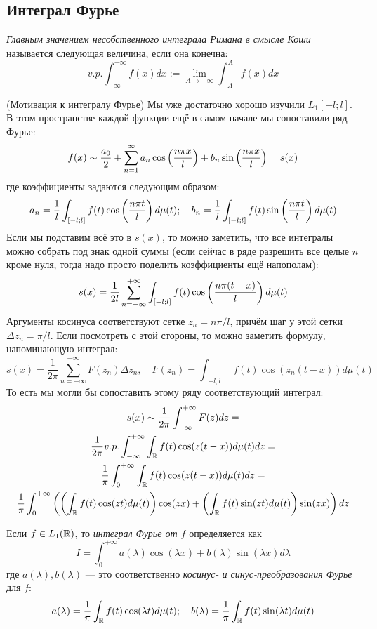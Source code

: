 \subsection{Интеграл Фурье}

\begin{reminder}
	\textit{Главным значением несобственного интеграла Римана в смысле Коши} называется следующая величина, если она конечна:
	\[
		v.p. \int_{-\infty}^{+\infty} f(x)dx := \lim_{A \to +\infty} \int_{-A}^A f(x)dx
	\]
\end{reminder}

\begin{note} (Мотивация к интегралу Фурье)
	Мы уже достаточно хорошо изучили $L_1[-l; l]$. В этом пространстве каждой функции ещё в самом начале мы сопоставили ряд Фурье:
	\[
		f(x) \sim \frac{a_0}{2} + \sum_{n = 1}^\infty a_n \cos\left(\frac{n\pi x}{l}\right) + b_n\sin\left(\frac{n\pi x}{l}\right) = s(x)
	\]
	где коэффициенты задаются следующим образом:
	\[
		a_n = \frac{1}{l}\int_{[-l; l]} f(t)\cos\left(\frac{n\pi t}{l}\right)d\mu(t); \quad b_n = \frac{1}{l}\int_{[-l; l]} f(t)\sin\left(\frac{n\pi t}{l}\right)d\mu(t)
	\]
	Если мы подставим всё это в $s(x)$, то можно заметить, что все интегралы можно собрать под знак одной суммы (если сейчас в ряде разрешить все целые $n$ кроме нуля, тогда надо просто поделить коэффициенты ещё напополам):
	\[
		s(x) = \frac{1}{2l} \sum_{n = -\infty}^{+\infty} \int_{[-l; l]} f(t)\cos\left(\frac{n\pi(t - x)}{l}\right)d\mu(t)
	\]
	Аргументы косинуса соответствуют сетке $z_n = n\pi / l$, причём шаг у этой сетки $\Delta z_n = \pi / l$. Если посмотреть с этой стороны, то можно заметить формулу, напоминающую интеграл:
	\[
		s(x) = \frac{1}{2\pi} \sum_{n = -\infty}^{+\infty} F(z_n)\Delta z_n, \quad F(z_n) = \int_{[-l; l]} f(t)\cos(z_n(t - x))d\mu(t)
	\]
	То есть мы могли бы сопоставить этому ряду соответствующий интеграл:
	\begin{multline*}
		s(x) \sim \frac{1}{2\pi} \int_{-\infty}^{+\infty} F(z)dz =
		\\
		\frac{1}{2\pi} v.p. \int_{-\infty}^{+\infty} \int_{\mathbb{R}} f(t)\cos(z(t - x))d\mu(t)dz =
		\\
		\frac{1}{\pi} \int_0^{+\infty} \int_{\mathbb{R}} f(t)\cos(z(t - x))d\mu(t)dz =
		\\
		\frac{1}{\pi} \int_0^{+\infty} \left(\left(\int_{\mathbb{R}} f(t)\cos(zt)d\mu(t)\right)\cos(zx) + \left(\int_{\mathbb{R}} f(t)\sin(zt)d\mu(t)\right)\sin(zx)\right)dz
	\end{multline*}
\end{note}

\begin{definition}
	Если $f \in L_1(\mathbb{R})$, то \textit{интеграл Фурье от $f$} определяется как
	\[
		I = \int_0^{+\infty} a(\lambda)\cos(\lambda x) + b(\lambda)\sin(\lambda x)d\lambda
	\]
	где $a(\lambda), b(\lambda)$ --- это соответственно \textit{косинус- и синус-преобразования Фурье} для $f$:
	\[
		a(\lambda) = \frac{1}{\pi} \int_{\mathbb{R}} f(t)\cos(\lambda t)d\mu(t); \quad b(\lambda) = \frac{1}{\pi} \int_{\mathbb{R}} f(t)\sin(\lambda t)d\mu(t)
	\]
\end{definition}

